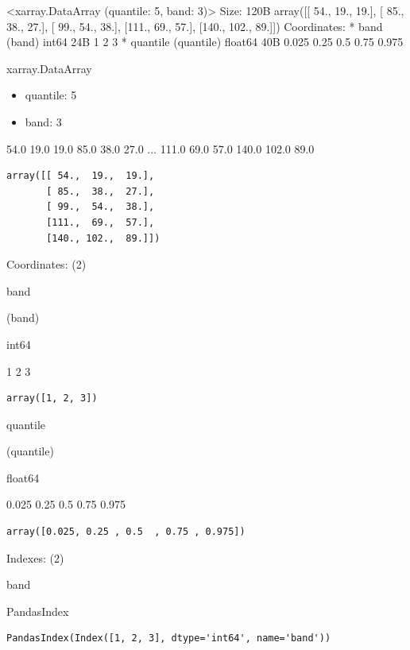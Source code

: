 \documentclass[
]{article}
\newenvironment{Shaded}{}{}
\newcommand{\NormalTok}[1]{#1}
\providecommand{\tightlist}{%
  \setlength{\itemsep}{0pt}\setlength{\parskip}{0pt}}
\begin{document}
\begin{Shaded}
\begin{Highlighting}[]
\NormalTok{\textless{}xarray.DataArray (quantile: 5, band: 3)\textgreater{} Size: 120B}
\NormalTok{array([[ 54.,  19.,  19.],}
\NormalTok{       [ 85.,  38.,  27.],}
\NormalTok{       [ 99.,  54.,  38.],}
\NormalTok{       [111.,  69.,  57.],}
\NormalTok{       [140., 102.,  89.]])}
\NormalTok{Coordinates:}
\NormalTok{  * band      (band) int64 24B 1 2 3}
\NormalTok{  * quantile  (quantile) float64 40B 0.025 0.25 0.5 0.75 0.975}
\end{Highlighting}
\end{Shaded}

xarray.DataArray

\begin{itemize}
\tightlist
\item
  {quantile}: 5
\item
  {band}: 3
\end{itemize}

{54.0 19.0 19.0 85.0 38.0 27.0 ... 111.0 69.0 57.0 140.0 102.0 89.0}

\begin{verbatim}
array([[ 54.,  19.,  19.],
       [ 85.,  38.,  27.],
       [ 99.,  54.,  38.],
       [111.,  69.,  57.],
       [140., 102.,  89.]])
\end{verbatim}

Coordinates: {(2)}

{band}

(band)

int64

1 2 3

\begin{verbatim}
array([1, 2, 3])
\end{verbatim}

{quantile}

(quantile)

float64

0.025 0.25 0.5 0.75 0.975

\begin{verbatim}
array([0.025, 0.25 , 0.5  , 0.75 , 0.975])
\end{verbatim}

Indexes: {(2)}

band

PandasIndex

\begin{verbatim}
PandasIndex(Index([1, 2, 3], dtype='int64', name='band'))
\end{verbatim}
\end{document}
